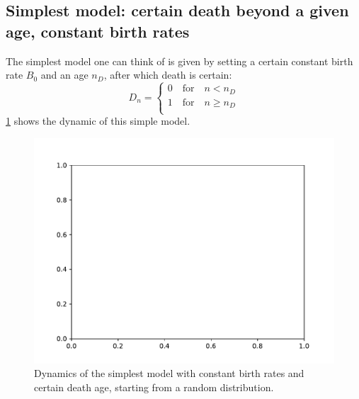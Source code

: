 \documentclass{article}
\begin{document}
\subsection{Simplest model: certain death beyond a given age, constant birth rates}
The simplest model one can think of is given by setting a certain constant birth rate $B_0$ and an age $n_D$, after which death is certain:
\begin{equation}
	D_n = 
	\begin{cases}
		0 \quad \text{for} \quad n<n_D \\
		1 \quad \text{for} \quad n\geq n_D \\
	\end{cases}
\end{equation}
\cref{fig:model1} shows the dynamic of this simple model.
\begin{figure}
	\includegraphics[width=\textwidth]{figures/model1.pdf}
	\caption{Dynamics of the simplest model with constant birth rates and certain death age, starting from a random distribution. \label{fig:model1}}
\end{figure}
\end{document}
